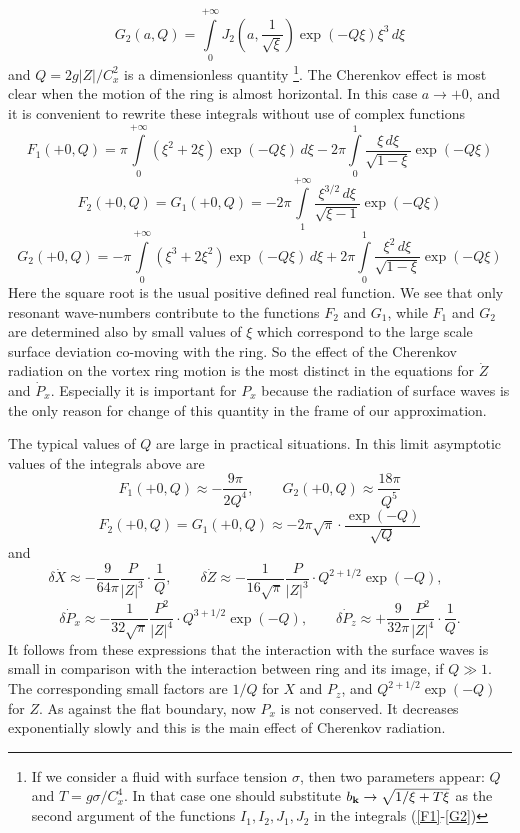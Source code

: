 \begin{equation}\label{G2}
G_2(a,Q)=\int\limits_0^{+\infty}J_2\left(a,\frac{1}{\sqrt{\xi}}\right)
\exp\left(-Q\xi\right)\xi^3\,d\xi
\end{equation}
and $Q={2g|Z|}/{C_x^2}$ is a dimensionless quantity
\footnote{
If we consider a fluid with surface tension $\sigma$, 
then two parameters appear: $Q$ and $T={g\sigma}/{C_x^4}$. 
In that case one should substitute $b_{\bf k}\to\sqrt{{1}/{\xi}+T\xi}$
as the second argument of the functions $I_1,I_2,J_1,J_2$ in the integrals
(\ref{F1}-\ref{G2})
}.
The Cherenkov effect is  most clear when
the motion of the ring is almost horizontal.
In this case $a\to +0$, and it is convenient to rewrite these
integrals without use of complex functions
\begin{equation}
F_1(+0,Q)=\pi\int\limits_0^{+\infty}\left(\xi^2+2\xi\right)
\exp\left(-Q\xi\right)\,d\xi-
2\pi\int\limits_0^{1}\frac{\xi\,d\xi}{\sqrt{1-\xi}}
\exp\left(-Q\xi\right)
\end{equation}
\begin{equation}
F_2(+0,Q)=G_1(+0,Q)=
-2\pi\int\limits_1^{+\infty}\frac{\xi^{3/2}\,d\xi}{\sqrt{\xi-1}}
\exp\left(-Q\xi\right)
\end{equation}
\begin{equation}
G_2(+0,Q)=-\pi\int\limits_0^{+\infty}\left(\xi^3+2\xi^2\right)
\exp\left(-Q\xi\right)\,d\xi+
2\pi\int\limits_0^{1}\frac{\xi^2\,d\xi}{\sqrt{1-\xi}}
\exp\left(-Q\xi\right)
\end{equation}
Here the square root is the usual positive defined real function. 
We see that only resonant wave-numbers contribute 
to the functions $F_2$ and $G_1$,
while  $F_1$ and $G_2$ are determined also by small values of $\xi$
which correspond to the large scale surface deviation  
co-moving with the ring.
So the effect of the Cherenkov radiation on the vortex ring motion
is the most distinct in the equations for $\dot Z$ and $\dot P_x$.
Especially it is important for $P_x$ because the radiation of surface waves
is the only reason for change of this quantity in the frame of our
approximation.

The typical values of $Q$ are large in practical situations. 
In this limit asymptotic values of the integrals above are
$$
F_1(+0,Q)\approx-\frac{9\pi}{2Q^4},\qquad 
G_2(+0,Q)\approx\frac{18\pi}{Q^5}
$$
$$
F_2(+0,Q)=G_1(+0,Q)\approx-2\pi\sqrt{\pi}\cdot\frac{\exp(-Q)}{\sqrt{Q}}
$$
and
$$
\delta \dot X\approx -\frac{9}{64\pi}\frac{P}{|Z|^3}\cdot\frac{1}{Q},\qquad 
\delta \dot Z\approx -\frac{1}{16\sqrt{\pi}}
\frac{P}{|Z|^3}\cdot Q^{2+1/2}\exp(-Q),\qquad 
$$
$$
\delta \dot P_x\approx  -\frac{1}{32\sqrt{\pi}}
\frac{P^2}{|Z|^4}\cdot Q^{3+1/2}\exp(-Q),\qquad 
\delta \dot P_z\approx +\frac{9}{32\pi}\frac{P^2}{|Z|^4}\cdot\frac{1}{Q}. 
$$
It follows from these expressions that the interaction with 
the surface waves is small in comparison with the 
interaction between ring and its image, if $Q\gg 1$. The corresponding 
small factors are $1/Q$ for $X$ and $P_z$, and $Q^{2+1/2}\exp(-Q)$ for $Z$.
As against the flat boundary, now $P_x$ is not conserved. 
It decreases exponentially slowly and this is the main effect of Cherenkov
radiation.

